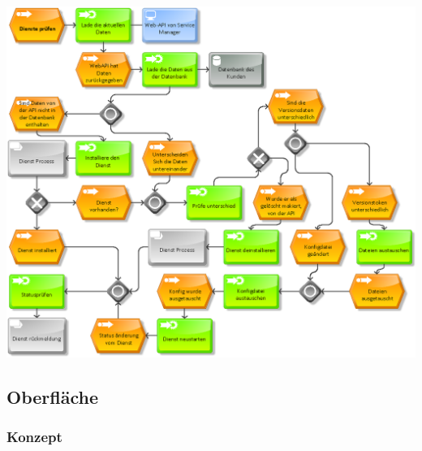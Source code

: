 \begin{center}
    \includegraphics[scale=0.4]{content/attachments/GP_Service_Check.png}
\end{center}

\subsection{Oberfläche}
\label{app:view}

\subsubsection{Konzept}
\label{app:view_conc}

